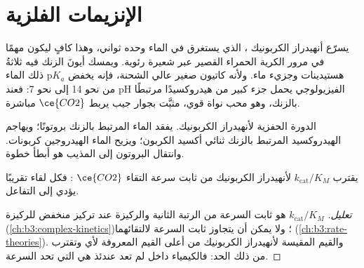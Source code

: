 \section{الإنزيمات الفلزية}

يسرّع أنهيدراز الكربونيك ، الذي يستغرق في الماء وحده
ثواني، وهذا كافٍ ليكون مهمًا في مرور الكرية الحمراء القصير عبر شعيرة
رئوية. ويمسك أيونَ الزنك فيه ثلاثةُ هستيدينات وجزيء ماء. ولأنه
كاتيون صغير عالي الشحنة، فإنه يخفض $\mathrm pK_a$ ذلك الماء من نحو 14 إلى
نحو 7: فعند pH الفيزيولوجي يحمل جزء كبير من  هيدروكسيدًا مرتبطًا
بالزنك، وهو محب نواة قوي، مثبَّت بجوار جيب يربط $\ce{CO2}$ مباشرة.

\begin{omfigure}

{\small الدورة الحفزية لأنهيدراز الكربونيك. يفقد الماء المرتبط بالزنك
بروتونًا؛ ويهاجم الهيدروكسيد المرتبط بالزنك ثنائي أكسيد الكربون؛ ويزيح الماء
الهيدروجين كربونات. وانتقال البروتون إلى المذيب هو أبطأ خطوة.}
\end{omfigure}

\begin{proposition}\label{prop:b3:bioinorganic:carbonic-anhydrase}
يقترب  $k_{\mathrm{cat}}/K_M$ لأنهيدراز الكربونيك من ثابت سرعة
التقاء $\ce{CO2}$ : فكل لقاء تقريبًا يؤدي إلى
التفاعل.
\end{proposition}

\begin{proof}[تعليل]
$k_{\mathrm{cat}}/K_M$ هو ثابت السرعة من الرتبة الثانية  والركيزة عند تركيز منخفض
للركيزة (\cref{ch:b3:complex-kinetics})؛ ولا يمكن أن يتجاوز
ثابت السرعة  لالتقائهما
(\cref{ch:b3:rate-theories}). والقيم المقيسة لأنهيدراز الكربونيك
من أعلى القيم المعروفة لأي  وتقترب من ذلك الحد: فالكيمياء
داخل  لم تعد عندئذ هي التي تحد السرعة.
\end{proof}

